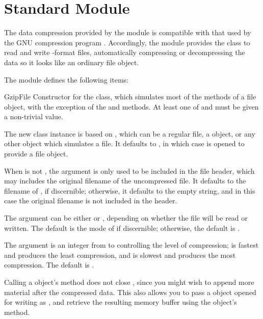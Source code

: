 \section{Standard Module }



The data compression provided by the  module is compatible
with that used by the GNU compression program .
Accordingly, the  module provides the 
class to read and write -format files, automatically
compressing or decompressing the data so it looks like an ordinary
file object.

The module defines the following items:

\begin{classdesc}{GzipFile}{}
Constructor for the  class, which simulates most of
the methods of a file object, with the exception of the
 and  methods.  At least one of
 and  must be given a non-trivial value.

The new class instance is based on , which can be a
regular file, a  object, or any other object which
simulates a file.  It defaults to , in which case
 is opened to provide a file object.

When  is not , the  argument is
only used to be included in the  file header, which may
includes the original filename of the uncompressed file.  It defaults
to the filename of , if discernible; otherwise, it
defaults to the empty string, and in this case the original filename
is not included in the header.

The  argument can be either  or ,
depending on whether the file will be read or written.  The default is
the mode of  if discernible; otherwise, the default is
.

The  argument is an integer from  to
 controlling the level of compression;  is fastest and
produces the least compression, and  is slowest and produces
the most compression.  The default is .

Calling a  object's  method does not
close , since you might wish to append more material
after the compressed data.  This also allows you to pass a
 object opened for writing as , and
retrieve the resulting memory buffer using the 
object's  method.
\end{classdesc}

